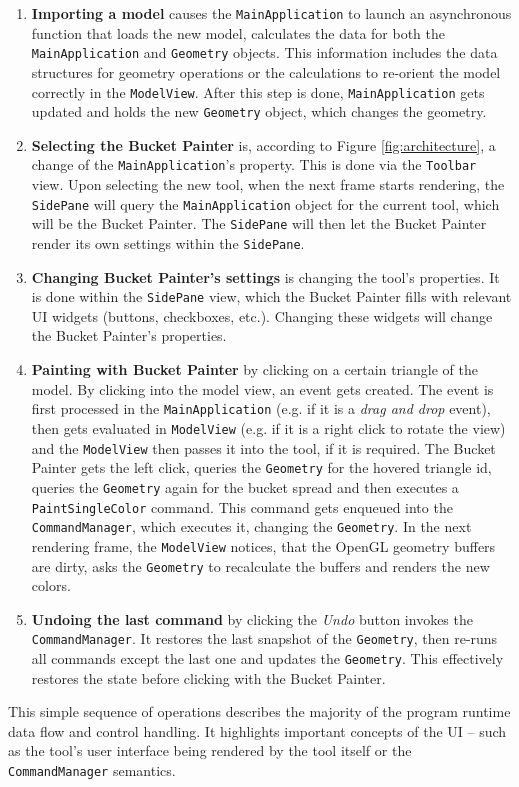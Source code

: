 \begin{enumerate}
\item \textbf{Importing a model} causes the \texttt{MainApplication} to launch an asynchronous function that loads the new model, calculates the data for both the \texttt{MainApplication} and \texttt{Geometry} objects. This information includes the data structures for geometry operations or the calculations to re-orient the model correctly in the \texttt{ModelView}. After this step is done, \texttt{MainApplication} gets updated and holds the new \texttt{Geometry} object, which changes the geometry.

\item \textbf{Selecting the Bucket Painter} is, according to Figure \ref{fig:architecture}, a change of the \texttt{MainApplication}'s property. This is done via the \texttt{Toolbar} view. Upon selecting the new tool, when the next frame starts rendering, the \texttt{SidePane} will query the \texttt{MainApplication} object for the current tool, which will be the Bucket Painter. The \texttt{SidePane} will then let the Bucket Painter render its own settings within the \texttt{SidePane}.

\item \textbf{Changing Bucket Painter's settings} is changing the tool's properties. It is done within the \texttt{SidePane} view, which the Bucket Painter fills with relevant UI widgets (buttons, checkboxes, etc.). Changing these widgets will change the Bucket Painter's properties.

\item \textbf{Painting with Bucket Painter} by clicking on a certain triangle of the model. By clicking into the model view, an event gets created. The event is first processed in the \texttt{MainApplication} (e.g. if it is a \textit{drag and drop} event), then gets evaluated in \texttt{ModelView} (e.g. if it is a right click to rotate the view) and the \texttt{ModelView} then passes it into the tool, if it is required. The Bucket Painter gets the left click, queries the \texttt{Geometry} for the hovered triangle id, queries the \texttt{Geometry} again for the bucket spread and then executes a \texttt{PaintSingleColor} command. This command gets enqueued into the \texttt{CommandManager}, which executes it, changing the \texttt{Geometry}. In the next rendering frame, the \texttt{ModelView} notices, that the OpenGL geometry buffers are dirty, asks the \texttt{Geometry} to recalculate the buffers and renders the new colors.

\item \textbf{Undoing the last command} by clicking the \textit{Undo} button invokes the \texttt{CommandManager}. It restores the last snapshot of the \texttt{Geometry}, then re-runs all commands except the last one and updates the \texttt{Geometry}. This effectively restores the state before clicking with the Bucket Painter.
\end{enumerate}

This simple sequence of operations describes the majority of the program runtime data flow and control handling. It highlights important concepts of the UI -- such as the tool's user interface being rendered by the tool itself or the \texttt{CommandManager} semantics.